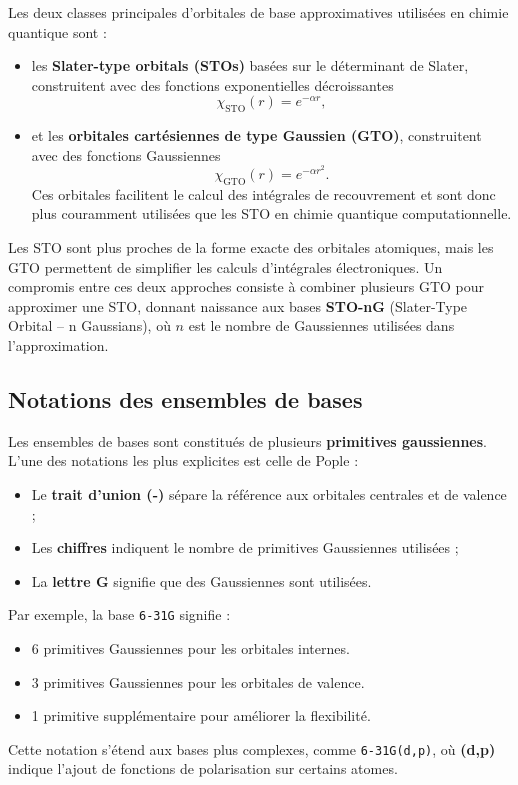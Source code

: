 \documentclass[12pt,a4paper]{article} %
\numberwithin{equation}{section} %
\numberwithin{figure}{section} %
\numberwithin{table}{section} %
\begin{document}
Les deux classes principales d'orbitales de base approximatives utilisées en chimie quantique sont :
\begin{itemize}
\item les \textbf{Slater-type orbitals (STOs)} basées sur le déterminant de Slater, construitent avec des fonctions exponentielles décroissantes
    \begin{equation}
        \chi_{\mathrm{STO}}(r) = e^{-\alpha r},
    \end{equation}
\item et les \textbf{orbitales cartésiennes de type Gaussien (GTO)}, construitent avec des fonctions Gaussiennes
    \begin{equation}
        \chi_{\mathrm{GTO}}(r) = e^{-\alpha r^2}.
    \end{equation}
  Ces orbitales facilitent le calcul des intégrales de recouvrement et sont donc plus couramment utilisées que les STO en chimie quantique computationnelle.
\end{itemize}

Les STO sont plus proches de la forme exacte des orbitales atomiques, mais les GTO permettent de simplifier les calculs d’intégrales électroniques. Un compromis entre ces deux approches consiste à combiner plusieurs GTO pour approximer une STO, donnant naissance aux bases \textbf{STO-nG} (Slater-Type Orbital – n Gaussians), où $n$ est le nombre de Gaussiennes utilisées dans l’approximation.

\subsection{Notations des ensembles de bases}

Les ensembles de bases sont constitués de plusieurs \textbf{primitives gaussiennes}. L'une des notations les plus explicites est celle de Pople :
\begin{itemize}
    \item Le \textbf{trait d'union (-)} sépare la référence aux orbitales centrales et de valence ;
    \item Les \textbf{chiffres} indiquent le nombre de primitives Gaussiennes utilisées ;
    \item La \textbf{lettre G} signifie que des Gaussiennes sont utilisées.
\end{itemize}

Par exemple, la base \texttt{6-31G} signifie :
\begin{itemize}
    \item 6 primitives Gaussiennes pour les orbitales internes.
    \item 3 primitives Gaussiennes pour les orbitales de valence.
    \item 1 primitive supplémentaire pour améliorer la flexibilité.
\end{itemize}
Cette notation s’étend aux bases plus complexes, comme \texttt{6-31G(d,p)}, où \textbf{(d,p)} indique l’ajout de fonctions de polarisation sur certains atomes.
\end{document}

